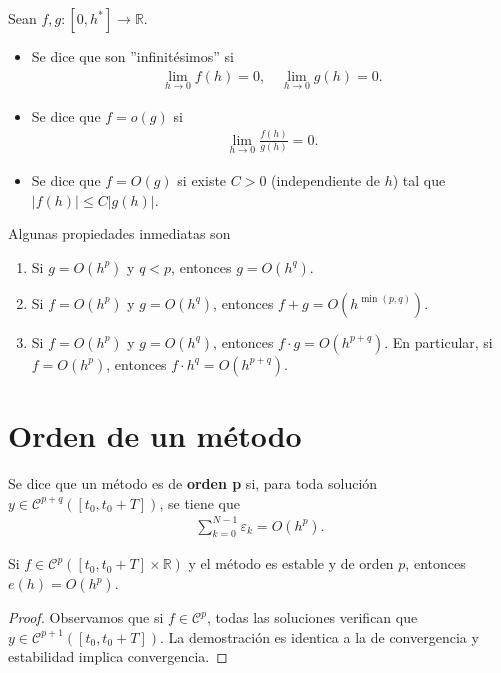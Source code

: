 \noindent Sean $f,g : [0,h^*] \longrightarrow \mathbb{R}$. 
\begin{itemize}
    \item Se dice que son ''infinitésimos'' si
    \begin{align*}
        \lim_{h \to 0} f(h) = 0, \quad\lim_{h \to 0} g(h) = 0.
    \end{align*}
    \item Se dice que $f = o(g)$ si 
    \begin{align*}
        \lim_{h \to 0} \frac{f(h)}{g(h)} = 0.
    \end{align*}
    \item Se dice que $f = O(g)$ si existe $C > 0$ (independiente de $h$) tal que $|f(h)| \leq C|g(h)|$.
\end{itemize}
Algunas propiedades inmediatas son
\begin{enumerate}
    \item Si $g = O(h^p)$ y $q < p$, entonces $g = O(h^q)$.
    \item Si $f = O(h^p)$ y $g = O(h^q)$, entonces $f + g = O(h^{\min(p,q)})$.
    \item Si $f = O(h^p)$ y $g = O(h^q)$, entonces $f \cdot g = O(h^{p+q})$. En particular, si $f = O(h^p)$, entonces $f \cdot h^q = O(h^{p+q})$.
\end{enumerate}

\section{Orden de un método}

\begin{defi}
    Se dice que un método es de \textbf{orden p} si, para toda solución $y \in \mathscr{C}^{p+q}([t_0,t_0+T])$, se tiene que
    \begin{align*}
        \sum_{k=0}^{N-1} \varepsilon_k = O(h^p).
    \end{align*}
\end{defi}

\begin{teo}
Si $f \in \mathscr{C}^p([t_0,t_0+T] \times \mathbb{R})$ y el método es estable y de orden $p$, entonces $e(h) = O(h^p)$.
\end{teo}

\begin{proof}
Observamos que si $f \in \mathscr{C}^p$, todas las soluciones verifican que $y \in \mathscr{C}^{p+1}([t_0,t_0+T])$. La demostración es identica a la de convergencia y estabilidad implica convergencia. 
\end{proof}

